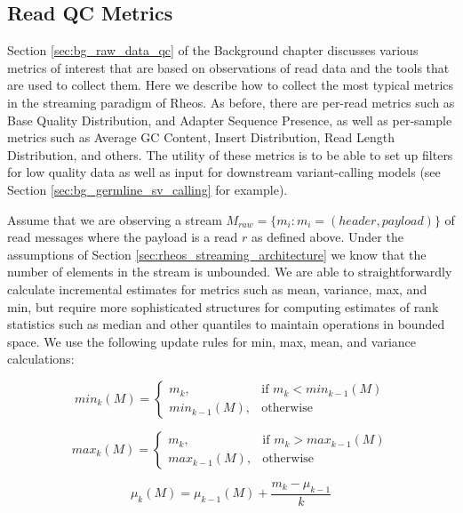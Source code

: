 \subsection{Read QC Metrics}
\label{sec:main_body_read_qc_metrics}

Section \ref{sec:bg_raw_data_qc} of the Background chapter discusses various metrics of interest that are based on observations of read data and the tools that are used to collect them. Here we describe how to collect the most typical metrics in the streaming paradigm of Rheos. As before, there are per-read metrics such as Base Quality Distribution, and Adapter Sequence Presence, as well as per-sample metrics such as Average GC Content, Insert Distribution, Read Length Distribution, and others. The utility of these metrics is to be able to set up filters for low quality data as well as input for downstream variant-calling models (see Section \ref{sec:bg_germline_sv_calling} for example). 

Assume that we are observing a stream $M_{raw} = \{m_i: m_i = (header, payload)\}$ of read messages where the payload is a read $r$ as defined above. Under the assumptions of Section \ref{sec:rheos_streaming_architecture} we know that the number of elements in the stream is unbounded. We are able to straightforwardly calculate incremental estimates for metrics such as mean, variance, max, and min, but require more sophisticated structures for computing estimates of rank statistics such as median and other quantiles to maintain operations in bounded space. We use the following update rules for min, max, mean, and variance\autocite{welford1962note} calculations:

\begin{equation}
    \label{eq:stream_min}
    min_k(M) =  \begin{cases}
        m_k,& \text{if } m_k < min_{k-1}(M)\\
        min_{k-1}(M),& \text{otherwise}
    \end{cases}
\end{equation}

\begin{equation}
    \label{eq:stream_max}
    max_k(M) =  \begin{cases}
        m_k,& \text{if } m_k > max_{k-1}(M)\\
        max_{k-1}(M),& \text{otherwise}
    \end{cases}
\end{equation}

\begin{equation}
    \label{eq:stream_mean}
    \mu_k(M) =  \mu_{k-1}(M) + \frac {m_k - \mu_{k-1}} {k} 
\end{equation}

